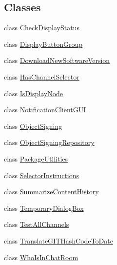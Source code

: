 \subsection*{Classes}
\begin{DoxyCompactItemize}
\item 
class \hyperlink{classgov_1_1fnal_1_1ppd_1_1dd_1_1util_1_1specific_1_1CheckDisplayStatus}{Check\-Display\-Status}
\item 
class \hyperlink{classgov_1_1fnal_1_1ppd_1_1dd_1_1util_1_1specific_1_1DisplayButtonGroup}{Display\-Button\-Group}
\item 
class \hyperlink{classgov_1_1fnal_1_1ppd_1_1dd_1_1util_1_1specific_1_1DownloadNewSoftwareVersion}{Download\-New\-Software\-Version}
\item 
class \hyperlink{classgov_1_1fnal_1_1ppd_1_1dd_1_1util_1_1specific_1_1HasChannelSelector}{Has\-Channel\-Selector}
\item 
class \hyperlink{classgov_1_1fnal_1_1ppd_1_1dd_1_1util_1_1specific_1_1IsDisplayNode}{Is\-Display\-Node}
\item 
class \hyperlink{classgov_1_1fnal_1_1ppd_1_1dd_1_1util_1_1specific_1_1NotificationClientGUI}{Notification\-Client\-G\-U\-I}
\item 
class \hyperlink{classgov_1_1fnal_1_1ppd_1_1dd_1_1util_1_1specific_1_1ObjectSigning}{Object\-Signing}
\item 
class \hyperlink{classgov_1_1fnal_1_1ppd_1_1dd_1_1util_1_1specific_1_1ObjectSigningRepository}{Object\-Signing\-Repository}
\item 
class \hyperlink{classgov_1_1fnal_1_1ppd_1_1dd_1_1util_1_1specific_1_1PackageUtilities}{Package\-Utilities}
\item 
class \hyperlink{classgov_1_1fnal_1_1ppd_1_1dd_1_1util_1_1specific_1_1SelectorInstructions}{Selector\-Instructions}
\item 
class \hyperlink{classgov_1_1fnal_1_1ppd_1_1dd_1_1util_1_1specific_1_1SummarizeContentHistory}{Summarize\-Content\-History}
\item 
class \hyperlink{classgov_1_1fnal_1_1ppd_1_1dd_1_1util_1_1specific_1_1TemporaryDialogBox}{Temporary\-Dialog\-Box}
\item 
class \hyperlink{classgov_1_1fnal_1_1ppd_1_1dd_1_1util_1_1specific_1_1TestAllChannels}{Test\-All\-Channels}
\item 
class \hyperlink{classgov_1_1fnal_1_1ppd_1_1dd_1_1util_1_1specific_1_1TranslateGITHashCodeToDate}{Translate\-G\-I\-T\-Hash\-Code\-To\-Date}
\item 
class \hyperlink{classgov_1_1fnal_1_1ppd_1_1dd_1_1util_1_1specific_1_1WhoIsInChatRoom}{Who\-Is\-In\-Chat\-Room}
\end{DoxyCompactItemize}
